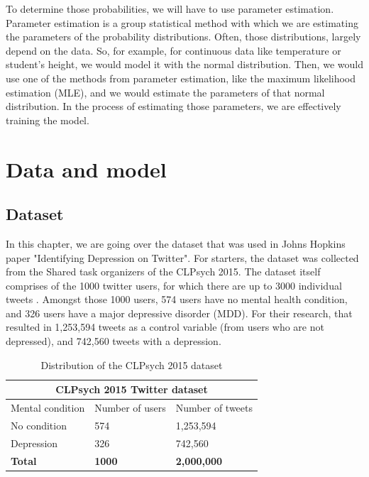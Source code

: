 \documentclass[times, utf8, seminar]{fer}
\begin{document}


To determine those probabilities, we will have to use parameter estimation. Parameter estimation is a group statistical method with which we are estimating the parameters of the probability distributions. Often, those distributions, largely depend on the data. So, for example, for continuous data like temperature or student's height, we would model it with the normal distribution. Then, we would use one of the methods from parameter estimation, like the maximum likelihood estimation (MLE), and we would estimate the parameters of that normal distribution. In the process of estimating those parameters, we are effectively training the model. 

\chapter{Data and model}

\section{Dataset}

In this chapter, we are going over the dataset that was used in Johns Hopkins paper "Identifying Depression on Twitter". For starters, the dataset was collected from the Shared task organizers of the CLPsych 2015. The dataset itself comprises of the 1000 twitter users, for which there are up to 3000 individual tweets \citep{clpsych}.  Amongst those 1000 users, 574 users have no mental health condition, and 326 users have a major depressive disorder (MDD). For their research, that resulted in 1,253,594 tweets as a control variable (from users who are not depressed), and 742,560 tweets with a depression. 

\begin{table}[h!]
	\centering
	\begin{tabular}{|p{3cm}|p{3cm}|p{3cm}|} 
		\hline
		\multicolumn{3}{|c|}{CLPsych 2015 Twitter dataset}\\
		\hline
		Mental condition & Number of users & Number of tweets \\ [0.5ex] 
		\hline
		No condition & 574 & 1,253,594 \\ 
		Depression & 326 & 742,560 \\
		\hline
		\textbf{Total} & \textbf{1000} & \textbf{2,000,000}\\
		\hline
	\end{tabular}
	\caption{Distribution of the CLPsych 2015 dataset}
	\label{Table:1}
\end{table}
\end{document}
